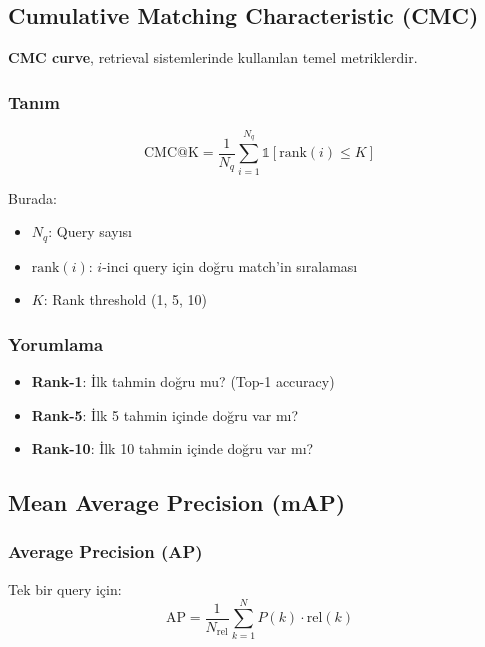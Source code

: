 \documentclass[12pt,a4paper]{article}
\begin{document}
\subsection{Cumulative Matching Characteristic (CMC)}

\textbf{CMC curve}, retrieval sistemlerinde kullanılan temel metriklerdir.

\subsubsection{Tanım}
\begin{equation}
    \text{CMC@K} = \frac{1}{N_q} \sum_{i=1}^{N_q} \mathbb{1}[\text{rank}(i) \leq K]
\end{equation}

Burada:
\begin{itemize}
    \item $N_q$: Query sayısı
    \item $\text{rank}(i)$: $i$-inci query için doğru match'in sıralaması
    \item $K$: Rank threshold (1, 5, 10)
\end{itemize}

\subsubsection{Yorumlama}
\begin{itemize}
    \item \textbf{Rank-1}: İlk tahmin doğru mu? (Top-1 accuracy)
    \item \textbf{Rank-5}: İlk 5 tahmin içinde doğru var mı?
    \item \textbf{Rank-10}: İlk 10 tahmin içinde doğru var mı?
\end{itemize}

\subsection{Mean Average Precision (mAP)}

\subsubsection{Average Precision (AP)}
Tek bir query için:
\begin{equation}
    \text{AP} = \frac{1}{N_{\text{rel}}} \sum_{k=1}^{N} P(k) \cdot \text{rel}(k)
\end{equation}
\end{document}
